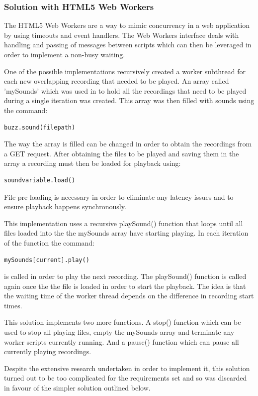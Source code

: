 \documentclass{l3proj}
\begin{document}
\subsubsection{Solution with HTML5 Web Workers}
The HTML5 Web Workers are a way to mimic concurrency in a web application by using timeouts and event handlers. The Web Workers interface deals with handling and passing of messages between scripts which can then be leveraged in order to implement a non-busy waiting.

One of the possible implementations recursively created a worker subthread for each new overlapping recording that needed to be played.  An array called 'mySounds' which was used in to hold all the recordings that need to be played during a single iteration was created. This array was then filled with sounds using the command:
\begin{verbatim}
buzz.sound(filepath)
\end{verbatim}
The way the array is filled can be changed in order to obtain the recordings from a GET request. After obtaining the files to be played and saving them in the array a recording must then be loaded for playback using:
\begin{verbatim}
soundvariable.load()
\end{verbatim}
File pre-loading is necessary in order to eliminate any latency issues and to ensure playback happens synchronously.

This implementation uses a recursive playSound() function that loops until all files loaded into the the mySounds array have starting playing. In each iteration of the function the command: 
\begin{verbatim}
mySounds[current].play()
\end{verbatim}
is called in order to play the next recording. The playSound() function is called again once the the file is loaded in order to start the playback. The idea is that the waiting time of the worker thread depends on the difference in recording start times.

This solution implements two more functions. A stop() function which can be used to stop all playing files, empty the mySounds array and terminate any worker scripts currently running. And a pause() function which can pause all currently playing recordings.

Despite the extensive research undertaken in order to implement it, this solution turned out to be too complicated for the requirements set and so was discarded in favour of the simpler solution outlined below.
\end{document}
